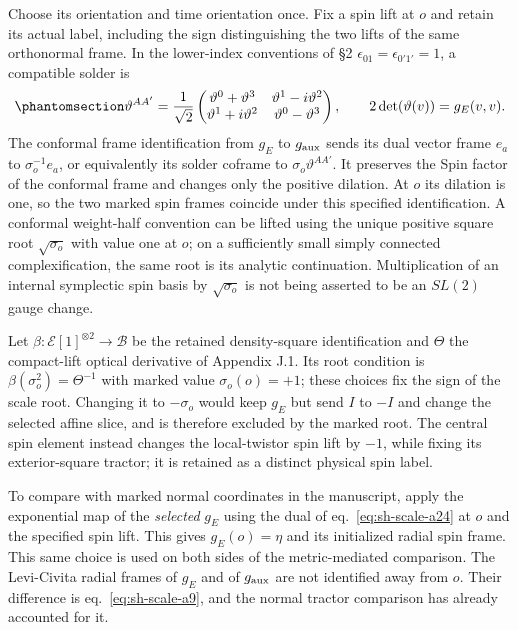 \documentclass[
  english,
  11pt,
  reqno]{amsart}
\begin{document}
Choose its orientation and time orientation once. Fix a spin lift at
\(o\) and retain its actual label, including the sign distinguishing the
two lifts of the same orthonormal frame. In the lower-index conventions
of §2 \(\epsilon_{01}=\epsilon_{0'1'}=1\), a compatible solder is
\begin{equation}\protect\phantomsection\label{eq:sh-scale-a26}{
\vartheta^{AA'}=\frac1{\sqrt2}
\begin{pmatrix}
\vartheta^0+\vartheta^3&\vartheta^1-i\vartheta^2\\
\vartheta^1+i\vartheta^2&\vartheta^0-\vartheta^3
\end{pmatrix},\qquad
2\det(\vartheta(v))=g_E(v,v).
}\end{equation} The conformal frame identification from \(g_E\) to
\(g_{\rm aux}\) sends its dual vector frame \(e_a\) to
\(\sigma_o^{-1}e_a\), or equivalently its solder coframe to
\(\sigma_o\vartheta^{AA'}\). It preserves the Spin factor of the
conformal frame and changes only the positive dilation. At \(o\) its
dilation is one, so the two marked spin frames coincide under this
specified identification. A conformal weight-half convention can be
lifted using the unique positive square root \(\sqrt{\sigma_o}\) with
value one at \(o\); on a sufficiently small simply connected
complexification, the same root is its analytic continuation.
Multiplication of an internal symplectic spin basis by
\(\sqrt{\sigma_o}\) is not being asserted to be an \(SL(2)\) gauge
change.

Let \(\beta:\mathcal E[1]^{\otimes2}\to\mathcal B\) be the retained
density-square identification and \(\Theta\) the compact-lift optical
derivative of Appendix J.1. Its root condition is
\(\beta(\sigma_o^2)=\Theta^{-1}\) with marked value \(\sigma_o(o)=+1\);
these choices fix the sign of the scale root. Changing it to
\(-\sigma_o\) would keep \(g_E\) but send \(I\) to \(-I\) and change the
selected affine slice, and is therefore excluded by the marked root. The
central spin element instead changes the local-twistor spin lift by
\(-1\), while fixing its exterior-square tractor; it is retained as a
distinct physical spin label.

To compare with marked normal coordinates in the manuscript, apply the
exponential map of the \emph{selected} \(g_E\) using the dual of
eq.~\ref{eq:sh-scale-a24} at \(o\) and the specified spin lift. This
gives \(g_E(o)=\eta\) and its initialized radial spin frame. This same
choice is used on both sides of the metric-mediated comparison. The
Levi-Civita radial frames of \(g_E\) and of \(g_{\rm aux}\) are not
identified away from \(o\). Their difference is
eq.~\ref{eq:sh-scale-a9}, and the normal tractor comparison has already
accounted for it.
\end{document}

